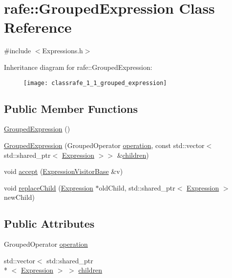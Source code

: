 \hypertarget{classrafe_1_1_grouped_expression}{\section{rafe\+:\+:Grouped\+Expression Class Reference}
\label{classrafe_1_1_grouped_expression}
}


{\ttfamily \#include $<$Expressions.\+h$>$}

Inheritance diagram for rafe\+:\+:Grouped\+Expression\+:\begin{figure}[H]
\begin{center}
\leavevmode
\texttt{[image: classrafe\_1\_1\_grouped\_expression]}
\end{center}
\end{figure}
\subsection*{Public Member Functions}
\begin{DoxyCompactItemize}
\item 
\hyperlink{classrafe_1_1_grouped_expression_a0f8325955c030168ab4590f631bcb0cf}{Grouped\+Expression} ()
\item 
\hyperlink{classrafe_1_1_grouped_expression_ab057facf61cab70b5a8e7aeb5438a55d}{Grouped\+Expression} (Grouped\+Operator \hyperlink{classrafe_1_1_grouped_expression_a269644ee2565184c9386dd57d24e93bb}{operation}, const std\+::vector$<$ std\+::shared\+\_\+ptr$<$ \hyperlink{classrafe_1_1_expression}{Expression} $>$$>$ \&\hyperlink{classrafe_1_1_grouped_expression_af31df501bd0d3e5ee9ce28ab4c71c4ee}{children})
\item 
void \hyperlink{classrafe_1_1_grouped_expression_a7f7e2cb9efd9457d80dc6365339957f6}{accept} (\hyperlink{classrafe_1_1_expression_visitor_base}{Expression\+Visitor\+Base} \&v)
\item 
void \hyperlink{classrafe_1_1_grouped_expression_ab770657757c0b374e4eacc8112ba9c4f}{replace\+Child} (\hyperlink{classrafe_1_1_expression}{Expression} $\ast$old\+Child, std\+::shared\+\_\+ptr$<$ \hyperlink{classrafe_1_1_expression}{Expression} $>$ new\+Child)
\end{DoxyCompactItemize}
\subsection*{Public Attributes}
\begin{DoxyCompactItemize}
\item 
Grouped\+Operator \hyperlink{classrafe_1_1_grouped_expression_a269644ee2565184c9386dd57d24e93bb}{operation}
\item 
std\+::vector$<$ std\+::shared\+\_\+ptr\\*
$<$ \hyperlink{classrafe_1_1_expression}{Expression} $>$ $>$ \hyperlink{classrafe_1_1_grouped_expression_af31df501bd0d3e5ee9ce28ab4c71c4ee}{children}
\end{DoxyCompactItemize}
